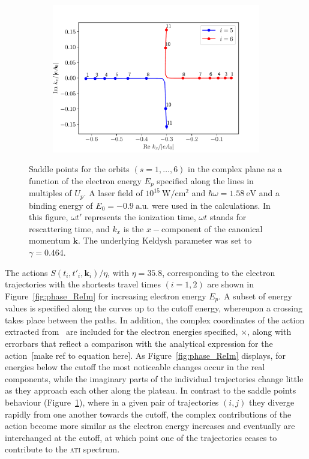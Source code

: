 \begin{figure}
\begin{subfigure}[b]{0.33\linewidth}
\end{subfigure}
\begin{subfigure}[b]{0.33\linewidth}
  \includegraphics[width=\textwidth]{figures/ch_ATI_SPA/rescattering/momentum56.pdf}
\end{subfigure}
\caption{Saddle points for the orbits $(s = 1,\dots,6)$ in the complex
  plane as a function of the electron energy $E_{p}$ specified along
  the lines in multiples of $U_{p}$. A laser field of
  $10^{15}\ \mathrm{W/cm^{2}}$ and $\hbar\omega = 1.58\ \mathrm{eV}$
  and a binding energy of $E_{0} = -0.9\ \mathrm{a.u.}$ were used in
  the calculations. In this figure, $\omega t'$ represents the
  ionization time, $\omega t$ stands for rescattering time, and
  $k_{x}$ is the $x-$component of the canonical momentum
  $\mathbf{k}$. The underlying Keldysh parameter was set to $\gamma =
  0.464$.}
  \label{fig:complex_paths}
\end{figure}

The actions $S(t_{i},t'_{i},\mathbf{k}_{i})/\eta$, with $\eta = 35.8$,
corresponding to the electron trajectories with the shortests travel
times $(i = 1, 2)$ are shown in Figure~\ref{fig:phase_ReIm} for
increasing electron energy $E_{p}$. A subset of energy values is
specified along the curves up to the cutoff energy, whereupon a
crossing takes place between the paths. In addition, the complex
coordinates of the action extracted from~\cite{phd_Kopold} are
included for the electron energies specified, $\times$, along with
errorbars that reflect a comparison with the analytical expression for
the action~[make ref to equation here]. As Figure~\ref{fig:phase_ReIm}
displays, for energies below the cutoff the most noticeable changes
occur in the real components, while the imaginary parts of the
individual trajectories change little as they approach each other
along the plateau. In contrast to the saddle points behaviour
(Figure~\ref{fig:complex_paths}), where in a given pair of
trajectories $(i, j)$ they diverge rapidly from one another towards
the cutoff, the complex contributions of the action become more
similar as the electron energy increases and eventually are
interchanged at the cutoff, at which point one of the trajectories
ceases to contribute to the \textsc{ati} spectrum.

